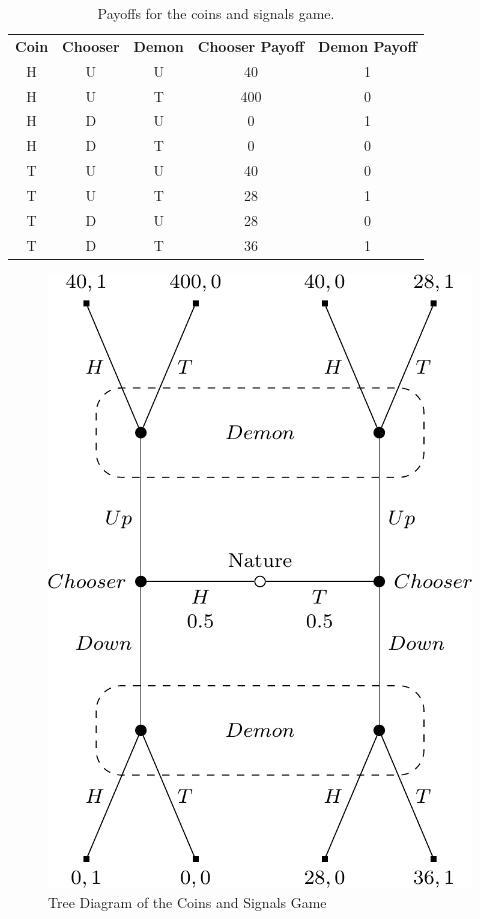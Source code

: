 \documentclass[
  12pt,
]{article}
\begin{document}
\begin{table}

\caption{\label{tab:payoffs-demon-coin}Payoffs for the coins and signals game.}
\centering \vspace{6pt}
\begin{tabular}[t]{>{}c>{}c>{}c>{}c>{}c}

\textbf{Coin} & \textbf{Chooser} & \textbf{Demon} & \textbf{Chooser Payoff} & \textbf{Demon Payoff}\\

H & U & U & 40 & 1\\
H & U & T & 400 & 0\\
H & D & U & 0 & 1\\
H & D & T & 0 & 0\\
T & U & U & 40 & 0\\
T & U & T & 28 & 1\\
T & D & U & 28 & 0\\
T & D & T & 36 & 1\\

\end{tabular}
\end{table}

\begin{figure}
\centering
\includegraphics{war-on-war_files/figure-latex/second-anti-war-1.png}
\caption{\label{fig:second-anti-war}Tree Diagram of the Coins and Signals Game}
\end{figure}
\end{document}
